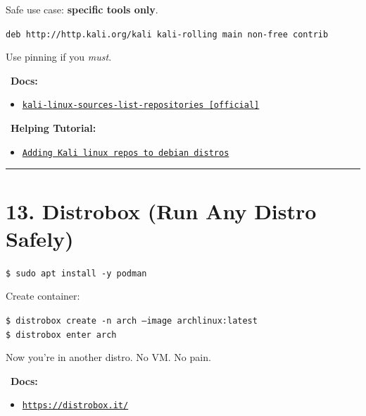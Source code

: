 \documentclass[12pt]{article}
\newcommand{\bookicon}{\faBook}
\newcommand{\computericon}{\faDesktop}
\begin{document}
Safe use case: \textbf{specific tools only}.

\begin{highlightbox}
\texttt{deb http://http.kali.org/kali kali-rolling main non-free contrib}
\end{highlightbox}

Use pinning if you \textit{must}.

\begin{infobox}
\bookicon\ \textbf{Docs:}
\begin{itemize}
    \item \href{https://www.kali.org/docs/general-use/kali-linux-sources-list-repositories/}{\texttt{kali-linux-sources-list-repositories [official]}}
\end{itemize}
\end{infobox}

\begin{infobox}
\computericon\ \textbf{Helping Tutorial:}
\begin{itemize}
    \item \href{https://youtu.be/YI1Q3R0TEYs?si=TO3KfOz4nq0sSIVw}{\texttt{Adding Kali linux repos to debian distros}}
\end{itemize}
\end{infobox}

\vspace{1em}
\begin{center}
\color{teamred}\rule{0.8\textwidth}{1pt}
\end{center}

\section*{13. Distrobox (Run Any Distro Safely)}

\begin{highlightbox}
\texttt{\$ sudo apt install -y podman}
\end{highlightbox}

Create container:

\begin{highlightbox}
\texttt{\$ distrobox create -n arch --image archlinux:latest}\\
\texttt{\$ distrobox enter arch}
\end{highlightbox}

Now you're in another distro. No VM. No pain.

\begin{infobox}
\bookicon\ \textbf{Docs:}
\begin{itemize}
    \item \href{https://distrobox.it/}{\texttt{https://distrobox.it/}}
\end{itemize}
\end{infobox}
\end{document}
